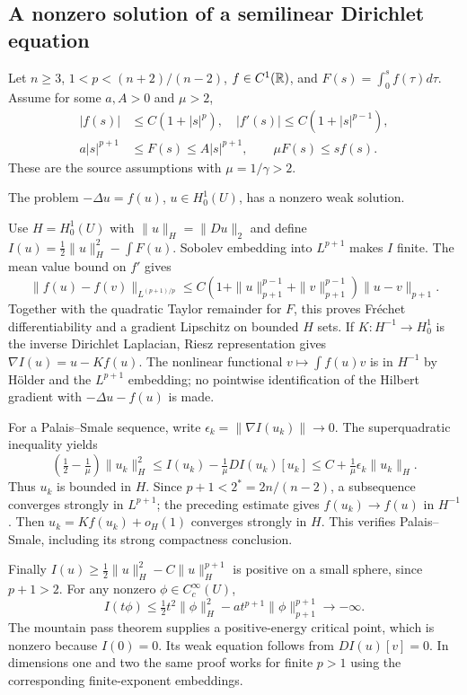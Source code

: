 \subsection{A nonzero solution of a semilinear Dirichlet equation}
Let $n\geq3$, $1<p<(n+2)/(n-2)$, $f\in C^1(\mathbb{R})$, and
$F(s)=\int_0^sf(\tau)d\tau$. Assume for some $a,A>0$ and $\mu>2$,
\begin{equation}\label{eq:8-mp-growth}
 \begin{split}
 |f(s)|&\leq C(1+|s|^p),\quad |f'(s)|\leq C(1+|s|^{p-1}),\\
 a|s|^{p+1}&\leq F(s)\leq A|s|^{p+1},\qquad \mu F(s)\leq s f(s).
 \end{split}
\end{equation}
These are the source assumptions with $\mu=1/\gamma>2$.
\Needspace{55mm}
\begin{theorem}
The problem $-\Delta u=f(u)$, $u\in H^1_0(U)$, has a nonzero weak solution.
\end{theorem}
\begin{expandedproof}
Use $H=H^1_0(U)$ with $\|u\|_H=\|Du\|_2$ and define
$I(u)=\frac12\|u\|_H^2-\int F(u)$.
Sobolev embedding into $L^{p+1}$ makes $I$ finite.
The mean value bound on $f'$ gives
\[
 \|f(u)-f(v)\|_{L^{(p+1)/p}}
 \leq C(1+\|u\|_{p+1}^{p-1}+\|v\|_{p+1}^{p-1})\|u-v\|_{p+1}.
\]
Together with the quadratic Taylor remainder for $F$, this proves
Fr\'echet differentiability and a gradient Lipschitz on bounded $H$ sets.
If $K:H^{-1}\to H^1_0$ is the inverse Dirichlet Laplacian, Riesz
representation gives $\nabla I(u)=u-Kf(u)$.
The nonlinear functional $v\mapsto\int f(u)v$ is in $H^{-1}$ by H\"older
and the $L^{p+1}$ embedding; no pointwise identification of the Hilbert
gradient with $-\Delta u-f(u)$ is made.

For a Palais--Smale sequence, write $\epsilon_k=\|\nabla I(u_k)\|\to0$.
The superquadratic inequality yields
\[
 \left(\tfrac12-\tfrac1\mu\right)\|u_k\|_H^2
 \leq I(u_k)-\tfrac1\mu DI(u_k)[u_k]
 \leq C+\tfrac1\mu\epsilon_k\|u_k\|_H.
\]
Thus $u_k$ is bounded in $H$. Since $p+1<2^*=2n/(n-2)$, a subsequence
converges strongly in $L^{p+1}$; the preceding estimate gives
$f(u_k)\to f(u)$ in $H^{-1}$.
Then $u_k=Kf(u_k)+o_H(1)$ converges strongly in $H$.
This verifies Palais--Smale, including its strong compactness conclusion.

Finally $I(u)\geq\frac12\|u\|_H^2-C\|u\|_H^{p+1}$ is positive on a
small sphere, since $p+1>2$. For any nonzero $\phi\in C_c^\infty(U)$,
\[
 I(t\phi)\leq\tfrac12t^2\|\phi\|_H^2
                   -a t^{p+1}\|\phi\|_{p+1}^{p+1}\longrightarrow-\infty.
\]
The mountain pass theorem supplies a positive-energy critical point,
which is nonzero because $I(0)=0$. Its weak equation follows from
$DI(u)[v]=0$. In dimensions one and two the same proof works for finite
$p>1$ using the corresponding finite-exponent embeddings.
\end{expandedproof}
\Needspace{55mm}

